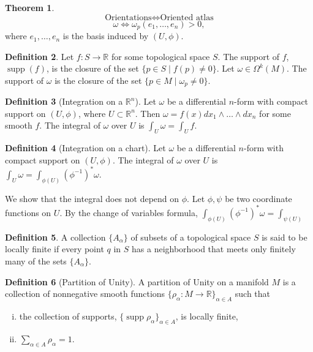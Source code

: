 \documentclass[]{article}
\DeclareMathOperator{\supp}{supp}
\theoremstyle{definition}
\newtheorem{theorem}{Theorem}[section] %
\theoremstyle{definition}
\newtheorem{definition}[theorem]{Definition} %
\begin{document}
\begin{theorem}
    \[\text{Orientations} \iff \text{Oriented atlas}\]
    \[ \omega \iff \omega_p(e_1,\dots,e_n)>0,\] where $e_1,\dots,e_n$ is the basis induced by $(U, \phi)$.
\end{theorem}

\begin{definition}
    Let $f:S \rightarrow \mathbb{R}$ for some topological space $S$. The support of $f$, $\supp(f)$, is the closure of the set $\{p\in S\mid f(p)\neq 0\}$. Let $\omega\in \Omega^k(M)$. The support of $\omega$ is the closure of the set $\{p\in M\mid \omega_p\neq 0\}$.
\end{definition}

\begin{definition}[Integration on a $\mathbb{R}^n$]
    Let $\omega$ be a differential $n$-form with compact support on $(U, \phi)$, where $U\subset\mathbb{R}^n$. Then $\omega=f(x)dx_1\wedge\dots\wedge dx_n$ for some smooth $f$. The integral of $\omega$ over $U$ is $\int_U\omega=\int_U f$.
\end{definition}

\begin{definition}[Integration on a chart]
    Let $\omega$ be a differential $n$-form with compact support on $(U, \phi)$. The integral of $\omega$ over $U$ is $\int_U\omega=\int_{\phi(U)}(\phi^{-1})^*\omega$. 
\end{definition}

We show that the integral does not depend on $\phi$. Let $\phi, \psi$ be two coordinate functions on $U$. By the change of variables formula, $\int_{\phi(U)}(\phi^{-1})^*\omega=\int_{\psi(U)}$

\begin{definition}
    A collection $\{A_\alpha \}$ of subsets of a topological space $S$ is said to be locally finite if every point $q$ in $S$ has a neighborhood that meets only finitely many of the sets $\{A_\alpha \}$.
\end{definition}

\begin{definition}[Partition of Unity]
    A partition of Unity on a manifold $M$ is a collection of nonnegative smooth functions $\{\rho_\alpha:M \rightarrow \mathbb{R}\}_{\alpha\in A}$ such that
    \begin{enumerate}[(i)]
        \item the collection of supports, $\{\supp\rho_\alpha\}_{\alpha\in A}$, is locally finite,
        \item $\sum_{\alpha\in A} \rho_\alpha = 1.$
    \end{enumerate}
\end{definition}
\end{document}
